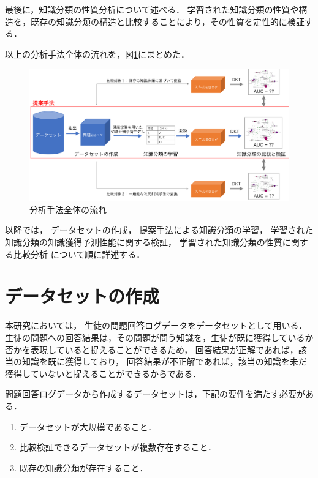 最後に，知識分類の性質分析について述べる．
学習された知識分類の性質や構造を，既存の知識分類の構造と比較することにより，その性質を定性的に検証する．


以上の分析手法全体の流れを，図\ref{fig:workflow}にまとめた．
\begin{figure}[htb]
\begin{center}
\includegraphics[width=400pt]{./img/workflow.png}
\end{center}
\caption{分析手法全体の流れ}
\label{fig:workflow}
\end{figure}

以降では，
データセットの作成，
提案手法による知識分類の学習，
学習された知識分類の知識獲得予測性能に関する検証，
学習された知識分類の性質に関する比較分析
について順に詳述する．


\section{データセットの作成}
本研究においては，
生徒の問題回答ログデータをデータセットとして用いる．
生徒の問題への回答結果は，その問題が問う知識を，生徒が既に獲得しているか否かを表現していると捉えることができるため，
回答結果が正解であれば，該当の知識を既に獲得しており，
回答結果が不正解であれば，該当の知識を未だ獲得していないと捉えることができるからである．

問題回答ログデータから作成するデータセットは，下記の要件を満たす必要がある．
\begin{enumerate}
	\item データセットが大規模であること．
	\item 比較検証できるデータセットが複数存在すること．
	\item 既存の知識分類が存在すること．
\end{enumerate}


